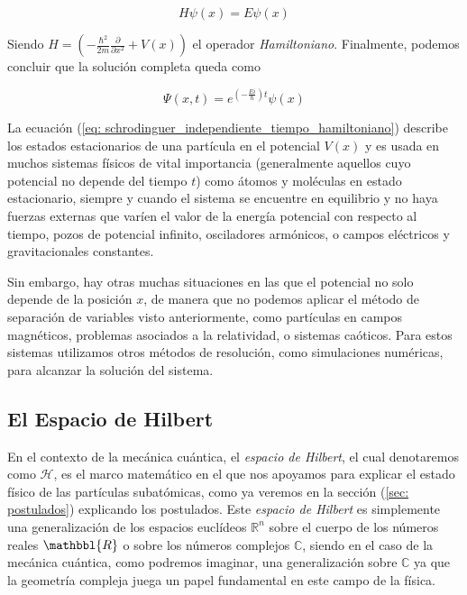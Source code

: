 \documentclass{article}
\numberwithin{equation}{section} %
\begin{document}
    \begin{equation}
        \boxed{ H \psi(x) = E \psi(x)}
        \label{eq: schrodinguer_independiente_tiempo_hamiltoniano}
    \end{equation}

    Siendo \( H = \left( - \frac{\hbar^{2}}{2m} \frac{\partial}{\partial x^{2}} + V(x) \right) \) el operador \textit{Hamiltoniano}. Finalmente, podemos concluir que la solución completa queda como

    \begin{equation}
        \Psi(x, t) = e ^ { \left( - \frac{Ei}{\hbar} \right) t} \psi(x)
    \end{equation}

    \vspace{5mm}

    La ecuación (\ref{eq: schrodinguer_independiente_tiempo_hamiltoniano}) describe los estados estacionarios de una partícula en el potencial \( V(x) \) y es usada en muchos sistemas físicos de vital importancia (generalmente aquellos cuyo potencial no depende del tiempo \( t \)) como átomos y moléculas en estado estacionario, siempre y cuando el sistema se encuentre en equilibrio y no haya fuerzas externas que varíen el valor de la energía potencial con respecto al tiempo, pozos de potencial infinito, osciladores armónicos, o campos eléctricos y gravitacionales constantes.

    \vspace{5mm}

    Sin embargo, hay otras muchas situaciones en las que el potencial no solo depende de la posición \( x \), de manera que no podemos aplicar el método de separación de variables visto anteriormente, como partículas en campos magnéticos, problemas asociados a la relatividad, o sistemas caóticos. Para estos sistemas utilizamos otros métodos de resolución, como simulaciones numéricas, para alcanzar la solución del sistema.

    \vspace{5mm}





    \subsection{El Espacio de Hilbert}

    \vspace{5mm}

    En el contexto de la mecánica cuántica, el \textit{espacio de Hilbert}, el cual denotaremos como \( \mathcal{H} \), es el marco matemático en el que nos apoyamos para explicar el estado físico de las partículas subatómicas, como ya veremos en la sección (\ref{sec: postulados}) explicando los postulados. Este \textit{espacio de Hilbert} es simplemente una generalización de los espacios euclídeos \( \mathbb{R}^{n} \) sobre el cuerpo de los números reales \( \mathbbl{R} \) o sobre los números complejos \( \mathbb{C} \), siendo en el caso de la mecánica cuántica, como podremos imaginar, una generalización sobre \( \mathbb{C} \) ya que la geometría compleja juega un papel fundamental en este campo de la física.
    
\end{document}
